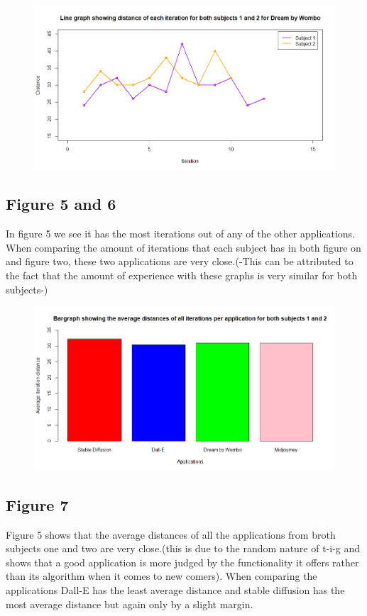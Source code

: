 \documentclass[]{report}
\begin{document}
\begin{figure}[!htbp]
	\centering
	\includegraphics[width=1\linewidth]{LineGraphDBW}
	\caption{}
	\label{fig:linegraphdbw}
\end{figure}

\pagebreak
\subsection{Figure 5 and 6}

In figure 5 we see it has the most iterations out of any of the other applications. When comparing the amount of iterations that each subject has in both figure on and figure two, these two applications are very close.(-This can be attributed to the fact that the amount of experience with these graphs is very similar for both subjects-)



\begin{figure}[!htbp]
	\centering
	\includegraphics[width=1\linewidth]{Bargraph}
	\caption{}
	\label{fig:bargraph}
\end{figure}
\pagebreak
\subsection{Figure 7}
Figure 5 shows that the average distances of all the applications from broth subjects one and two are very close.(this is due to the random nature of t-i-g and shows that a good application is more judged by the functionality it offers rather than its algorithm when it comes to new comers). When comparing the applications Dall-E has the least average distance and stable diffusion has the most average distance but again only by a slight margin. 
	
\end{document}
